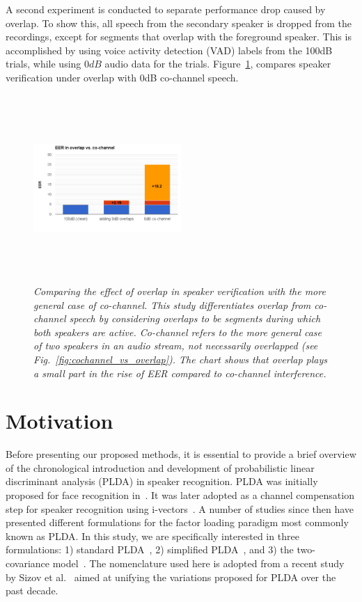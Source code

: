 A second experiment is conducted to separate performance drop caused by overlap. To show this, all speech from the secondary speaker is dropped from the recordings, except for segments that overlap with the foreground speaker. 
This is accomplished by using voice activity detection (VAD) labels from the 100dB trials, while using $0dB$ audio data for the trials. 
Figure~\ref{fig:ovl_in_sid}, compares speaker verification under overlap with 0dB co-channel speech. 

\begin{figure}[h!]
	\vspace{-1mm}
	\centering
	\includegraphics[height = 2.8in, width=0.5\textwidth]{figures/overlap_vs_cochannel_sid-crop}
	\vspace{-8mm}
	\caption{\it \small Comparing the effect of overlap in speaker verification with the more general case of co-channel. This study differentiates overlap from co-channel speech by considering overlaps to be segments during which both speakers are active. Co-channel refers to the more general case of two speakers in an audio stream, not necessarily overlapped (see Fig.~\ref{fig:cochannel_vs_overlap}). The chart shows that overlap plays a small part in the rise of EER compared to co-channel interference.}
	\label{fig:ovl_in_sid}
	\vspace{-1mm}
\end{figure}


\section{Motivation}
\label{sec:background}
Before presenting our proposed methods, it is essential to provide a brief overview of the chronological introduction and development of probabilistic linear discriminant analysis (PLDA) in speaker recognition. 
PLDA was initially proposed for face recognition in~\cite{prince_plda}. 
It was later adopted as a channel compensation step for speaker recognition using i-vectors~\cite{kenny2010bayesian}. 
A number of studies since then have presented different formulations for the factor loading paradigm most commonly known as PLDA. 
In this study, we are specifically interested in three formulations: 1) standard PLDA~\cite{kenny_plda}, 2) simplified PLDA~\cite{kenny_plda2,Daniel2011is}, and 3) the two-covariance model~\cite{brummer2010twocov}. 
The nomenclature used here is adopted from a recent study by Sizov et al.~\cite{sizov2014unifying} aimed at unifying the variations proposed for PLDA over the past decade. 



